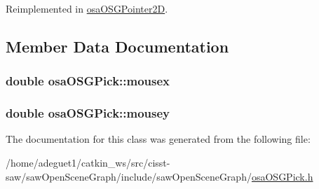Reimplemented in \hyperlink{classosa_o_s_g_pointer2_d_a23023fdd12565643645cc74436f19150}{osa\-O\-S\-G\-Pointer2\-D}.



\subsection{Member Data Documentation}
\hypertarget{classosa_o_s_g_pick_a6a873ebac73e6a50727bf6899f4d3ba9}{
\subsubsection[{mousex}]{\setlength{\rightskip}{0pt plus 5cm}double osa\-O\-S\-G\-Pick\-::mousex\hspace{0.3cm}{\ttfamily [protected]}}}\label{classosa_o_s_g_pick_a6a873ebac73e6a50727bf6899f4d3ba9}
\hypertarget{classosa_o_s_g_pick_a0ff8d75903e0ff5611df44df27d2b374}{
\subsubsection[{mousey}]{\setlength{\rightskip}{0pt plus 5cm}double osa\-O\-S\-G\-Pick\-::mousey\hspace{0.3cm}{\ttfamily [protected]}}}\label{classosa_o_s_g_pick_a0ff8d75903e0ff5611df44df27d2b374}


The documentation for this class was generated from the following file\-:\begin{DoxyCompactItemize}
\item 
/home/adeguet1/catkin\-\_\-ws/src/cisst-\/saw/saw\-Open\-Scene\-Graph/include/saw\-Open\-Scene\-Graph/\hyperlink{osa_o_s_g_pick_8h}{osa\-O\-S\-G\-Pick.\-h}\end{DoxyCompactItemize}
